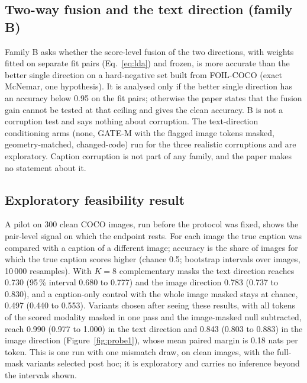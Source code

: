 \subsection{Two-way fusion and the text direction (family B)}\label{ssec:fusionprotocol}
Family B asks whether the score-level fusion of the two directions, with weights fitted on separate fit pairs (Eq.~\eqref{eq:lda}) and
frozen, is more accurate than the better single direction on a hard-negative set built from FOIL-COCO
 (exact McNemar, one hypothesis).
It is analysed only if the better single direction has an accuracy below 0.95 on the fit pairs; otherwise the paper states that the
fusion gain cannot be tested at that ceiling and gives the clean accuracy.
B is not a corruption test and says nothing about corruption.
The text-direction conditioning arms (none, GATE-M with the flagged image tokens masked, geometry-matched, changed-code) run for the
three realistic corruptions and are exploratory.
Caption corruption is not part of any family, and the paper makes no statement about it.

\subsection{Exploratory feasibility result}\label{ssec:pilot}
A pilot on 300 clean COCO images, run before the protocol was fixed, shows the pair-level signal on which the endpoint rests.
For each image the true caption was compared with a caption of a different image; accuracy is the share of images for which the true
caption scores higher (chance 0.5; bootstrap intervals over images, 10\,000 resamples).
With $K=8$ complementary masks the text direction reaches 0.730 (95\,\% interval 0.680 to 0.777) and the image direction 0.783
(0.737 to 0.830), and a caption-only control with the whole image masked stays at chance, 0.497 (0.440 to 0.553).
Variants chosen after seeing these results, with all tokens of the scored modality masked in one pass and the image-masked null
subtracted, reach 0.990 (0.977 to 1.000) in the text direction and 0.843 (0.803 to 0.883) in the image direction
(Figure~\ref{fig:probe1}), whose mean paired margin is 0.18 nats per token.
This is one run with one mismatch draw, on clean images, with the full-mask variants selected post hoc; it is exploratory and
carries no inference beyond the intervals shown.

